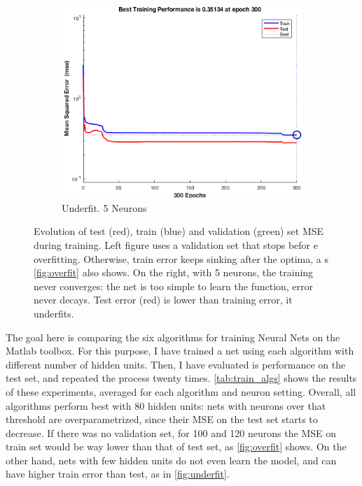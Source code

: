 \documentclass[a4paper, 10pt]{article}
\begin{document}
\begin{figure}[h]
\begin{adjustwidth}{-1.1cm}{-1.1cm}
    \begin{subfigure}[t]{0.3\linewidth}
      \includegraphics[width=1\linewidth]{./lab1/underfit.png}
      \caption{Underfit. 5 Neurons}
      \label{fig:underfit}
    \end{subfigure}
    \end{adjustwidth}
    \caption{Evolution of test (red), train (blue) and validation (green) set 
      MSE during training.  Left figure uses a validation set that stops befor
      e overfitting.  Otherwise, train error keeps sinking after the optima, a
      s \autoref{fig:overfit} also shows. On the right, with 5 neurons, the 
      training never converges: the net is too simple to learn the function, 
      error never decays. Test error (red) is lower than training error, it
      underfits.}
    \label{fig:validation}
  \end{figure}


  The goal here is comparing the six algorithms for training Neural Nets on
  the Matlab toolbox. For this purpose, I have trained a net using each 
  algorithm with different number of hidden units. Then, I have evaluated
  is performance on the test set, and repeated the process twenty times. 
  \autoref{tab:train_algs} shows the results of these experiments, averaged for
  each algorithm and neuron setting. Overall, all algorithms perform best
  with 80 hidden units: nets with neurons over that threshold 
  are overparametrized, since their MSE on the test set starts to decrease. 
  If there was no validation set, for 100 and 120 neurons the MSE on 
  train set would be way lower than that of test set, as
  \autoref{fig:overfit} shows. On the other hand, nets with few hidden units
  do not even learn the model, and can have higher train error than test, as in
  \autoref{fig:underfit}.
\end{document}
